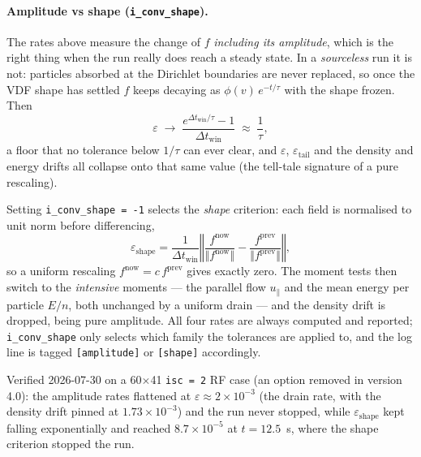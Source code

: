 \documentclass[11pt,a4paper]{article}
\begin{document}
\paragraph{Amplitude vs shape (\texttt{i\_conv\_shape}).}  The rates above measure
the change of $f$ \emph{including its amplitude}, which is the right thing when the
run really does reach a steady state.  In a \emph{sourceless} run it is not: particles
absorbed at the Dirichlet boundaries are never replaced, so once the VDF shape has
settled $f$ keeps decaying as $\phi(v)\,e^{-t/\tau}$ with the shape frozen.  Then
\begin{equation}
  \varepsilon \;\longrightarrow\; \frac{e^{\Delta t_\mathrm{win}/\tau}-1}
                                       {\Delta t_\mathrm{win}} \;\approx\; \frac{1}{\tau},
\end{equation}
a floor that no tolerance below $1/\tau$ can ever clear, and $\varepsilon$,
$\varepsilon_\mathrm{tail}$ and the density and energy drifts all collapse onto that
same value (the tell-tale signature of a pure rescaling).

Setting \texttt{i\_conv\_shape = -1} selects the \emph{shape} criterion: each field is
normalised to unit norm before differencing,
\begin{equation}
  \varepsilon_\mathrm{shape} =
    \frac{1}{\Delta t_\mathrm{win}}
    \left\Vert \frac{f^\mathrm{now}}{\Vert f^\mathrm{now}\Vert}
             - \frac{f^\mathrm{prev}}{\Vert f^\mathrm{prev}\Vert} \right\Vert ,
  \label{eq:epsshape}
\end{equation}
so a uniform rescaling $f^\mathrm{now} = c\,f^\mathrm{prev}$ gives exactly zero.  The
moment tests then switch to the \emph{intensive} moments --- the parallel flow
$u_\parallel$ and the mean energy per particle $E/n$, both unchanged by a uniform
drain --- and the density drift is dropped, being pure amplitude.  All four rates are
always computed and reported; \texttt{i\_conv\_shape} only selects which family the
tolerances are applied to, and the log line is tagged \texttt{[amplitude]} or
\texttt{[shape]} accordingly.

Verified 2026-07-30 on a 60$\times$41 \texttt{isc = 2} RF case (an option removed in
version 4.0): the amplitude rates
flattened at $\varepsilon \approx 2\times10^{-3}$ (the drain rate, with the density
drift pinned at $1.73\times10^{-3}$) and the run never stopped, while
$\varepsilon_\mathrm{shape}$ kept falling exponentially and reached
$8.7\times10^{-5}$ at $t = 12.5$~s, where the shape criterion stopped the run.
\end{document}
